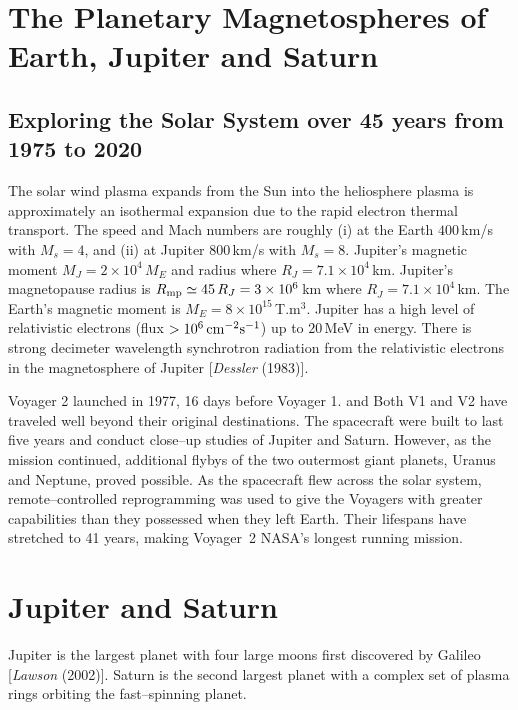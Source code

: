 \documentclass[a4paper,openany,12pt]{report}
\begin{document}
\section{The Planetary Magnetospheres of Earth, Jupiter and Saturn}

\subsection{Exploring the Solar System over 45 years from 1975 to 2020}

The solar wind plasma expands from the Sun into the heliosphere plasma is approximately an isothermal expansion due to the rapid electron thermal transport. The speed and Mach numbers are roughly (i) at the Earth $400\,$km/s with $M_s = 4$, and (ii) at Jupiter $800\,$km/s with $M_s = 8$. Jupiter's magnetic moment $M_J = 2\times 10^4\,M_E$ and radius where $R_J = 7.1\times 10^4\,$km. Jupiter's magnetopause radius is $R_{\rm mp}\simeq 45\,R_J = 3\times 10^6\,$km where $R_J = 7.1\times 10^4\,$km.  The Earth's magnetic moment is $M_E = 8\times 10^{15}\,$T.m$^3$. Jupiter has a high level of relativistic electrons (flux $> 10^6\,\rm cm^{-2} s^{-1}$) up to $20\,$MeV in energy. There is strong decimeter wavelength synchrotron radiation from the relativistic electrons in the magnetosphere of Jupiter [\emph{Dessler} (1983)].

Voyager 2 launched in 1977, 16 days before Voyager 1. and Both V1 and V2 have traveled well beyond their original destinations. The spacecraft were built to last five years and conduct close--up studies of Jupiter and Saturn. However, as the mission continued, additional flybys of the two outermost giant planets, Uranus and Neptune, proved possible. As the spacecraft flew across the solar system, remote--controlled reprogramming was used to give the Voyagers with greater capabilities than they possessed when they left Earth. Their lifespans have stretched to 41 years, making Voyager~2 NASA's longest running mission.

\section{Jupiter and Saturn}

Jupiter is the largest planet with four large moons first discovered by Galileo [\emph{Lawson} (2002)]. Saturn is the second largest planet with a complex set of plasma rings orbiting the fast--spinning planet. 
\end{document}
